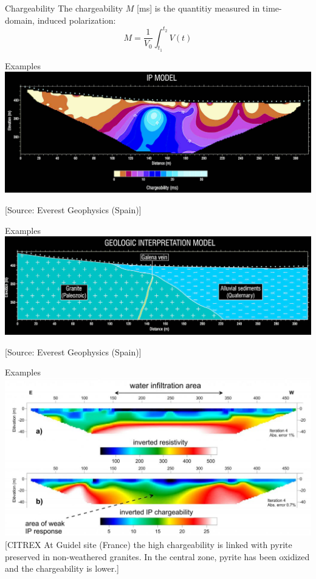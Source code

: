 \begin{frame}
  \begin{PointSix}{Chargeability}
    \small
    The chargeability $M$ [ms] is the quantitiy measured in time-domain, induced polarization:
    $$
      M = \frac{1}{V_0}\int_{t_1}^{t_2}V(t)
    $$
  \end{PointSix}
\end{frame}


\begin{frame}{Examples}
  \includegraphics[width=0.8\linewidth]{Figures/InducedPolarization/resistivity-and-chargeability_ip_EverestGeophysics.png}

  \tiny[Source: Everest Geophysics (Spain)]
\end{frame}

\begin{frame}{Examples}
  \includegraphics[width=0.8\linewidth]{Figures/InducedPolarization/resistivity-and-chargeability_subsurface_EverestGeophysics.png}

  \tiny[Source: Everest Geophysics (Spain)]
\end{frame}


\begin{frame}{Examples}
  \includegraphics[width=0.8\linewidth]{Figures/InducedPolarization/IP_Guidal.jpg}
\tiny [CITREX At Guidel site (France) the high chargeability is linked with pyrite preserved in non-weathered granites. In the central zone, pyrite has been oxidized and the chargeability is lower.]
\end{frame}


